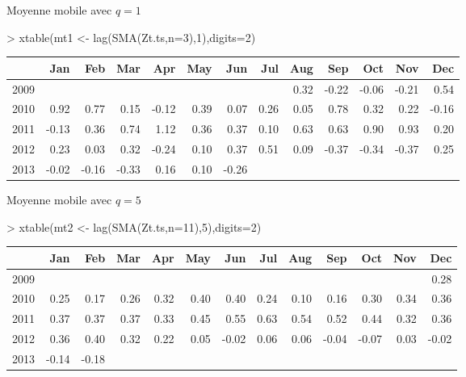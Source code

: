 \documentclass{article}
\begin{document}
Moyenne mobile avec $q=1$
\begin{Schunk}
\begin{Sinput}
> xtable(mt1 <- lag(SMA(Zt.ts,n=3),1),digits=2)
\end{Sinput}
\begin{table}[ht]
\centering
\begin{tabular}{rrrrrrrrrrrrr}
  \hline
 & Jan & Feb & Mar & Apr & May & Jun & Jul & Aug & Sep & Oct & Nov & Dec \\ 
  \hline
2009 &  &  &  &  &  &  &  & 0.32 & -0.22 & -0.06 & -0.21 & 0.54 \\ 
  2010 & 0.92 & 0.77 & 0.15 & -0.12 & 0.39 & 0.07 & 0.26 & 0.05 & 0.78 & 0.32 & 0.22 & -0.16 \\ 
  2011 & -0.13 & 0.36 & 0.74 & 1.12 & 0.36 & 0.37 & 0.10 & 0.63 & 0.63 & 0.90 & 0.93 & 0.20 \\ 
  2012 & 0.23 & 0.03 & 0.32 & -0.24 & 0.10 & 0.37 & 0.51 & 0.09 & -0.37 & -0.34 & -0.37 & 0.25 \\ 
  2013 & -0.02 & -0.16 & -0.33 & 0.16 & 0.10 & -0.26 &  &  &  &  &  &  \\ 
   \hline
\end{tabular}
\end{table}\end{Schunk}
\clearpage 
Moyenne mobile avec $q=5$
\begin{Schunk}
\begin{Sinput}
> xtable(mt2 <- lag(SMA(Zt.ts,n=11),5),digits=2)
\end{Sinput}
\begin{table}[ht]
\centering
\begin{tabular}{rrrrrrrrrrrrr}
  \hline
 & Jan & Feb & Mar & Apr & May & Jun & Jul & Aug & Sep & Oct & Nov & Dec \\ 
  \hline
2009 &  &  &  &  &  &  &  &  &  &  &  & 0.28 \\ 
  2010 & 0.25 & 0.17 & 0.26 & 0.32 & 0.40 & 0.40 & 0.24 & 0.10 & 0.16 & 0.30 & 0.34 & 0.36 \\ 
  2011 & 0.37 & 0.37 & 0.37 & 0.33 & 0.45 & 0.55 & 0.63 & 0.54 & 0.52 & 0.44 & 0.32 & 0.36 \\ 
  2012 & 0.36 & 0.40 & 0.32 & 0.22 & 0.05 & -0.02 & 0.06 & 0.06 & -0.04 & -0.07 & 0.03 & -0.02 \\ 
  2013 & -0.14 & -0.18 &  &  &  &  &  &  &  &  &  &  \\ 
   \hline
\end{tabular}
\end{table}\end{Schunk}
\end{document}
